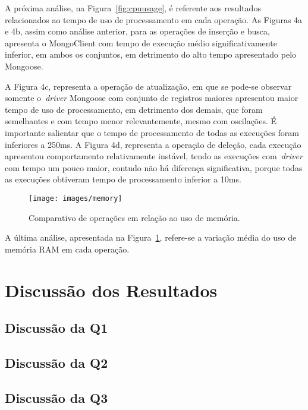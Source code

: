 \documentclass[12pt]{article}
\begin{document}
A próxima análise, na Figura~\ref{fig:cpuusage}, é referente aos resultados relacionados ao tempo de uso de processamento em cada operação.
As Figuras 4a e 4b, assim como análise anterior, para as operações de inserção e busca, apresenta o MongoClient com tempo de execução médio significativamente inferior, em ambos os conjuntos, em detrimento do alto tempo apresentado pelo Mongoose.

A Figura 4c, representa a operação de atualização, em que se pode-se observar somente o~\emph{driver} Mongoose com conjunto de registros maiores apresentou maior tempo de uso de processamento, em detrimento dos demais, que foram semelhantes e com tempo menor relevantemente, mesmo com oscilações. 
É importante salientar que o tempo de processamento de todas as execuções foram inferiores a 250ms.
A Figura 4d, representa a operação de deleção, cada execução apresentou comportamento relativamente instável, tendo as execuções com~\emph{driver} com tempo um pouco maior, contudo não há diferença significativa, porque todas as execuções obtiveram tempo de processamento inferior a 10ms.

\begin{figure}[ht]
    \centering
    \texttt{[image: images/memory]}
    \caption{Comparativo de operações em relação ao uso de memória.}
    \label{fig:memory}
\end{figure}

A última análise, apresentada na Figura~\ref{fig:memory}, refere-se a variação média do uso de memória RAM em cada operação. 



\section{Discussão dos Resultados}
\label{section:discussao}

\subsection{Discussão da Q1}

\subsection{Discussão da Q2}

\subsection{Discussão da Q3}
\end{document}

